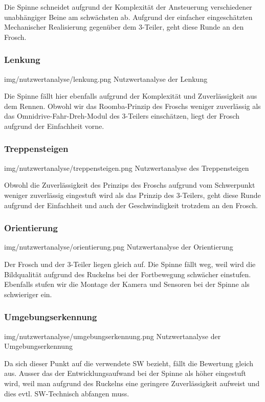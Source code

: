 Die Spinne schneidet aufgrund der Komplexität der Ansteuerung verschiedener unabhängiger Beine am schwächsten ab. Aufgrund der einfacher eingeschätzten Mechanischer Realisierung gegenüber dem 3-Teiler, geht diese Runde an den Frosch.
   
\subsubsection{Lenkung}
\image
   {img/nutzwertanalyse/lenkung.png}
   {Nutzwertanalyse der Lenkung}
   
Die Spinne fällt hier ebenfalls aufgrund der Komplexität und Zuverlässigkeit aus dem Rennen. Obwohl wir das Roomba-Prinzip des Froschs weniger zuverlässig als das Omnidrive-Fahr-Dreh-Modul des 3-Teilers einschätzen, liegt der Frosch aufgrund der Einfachheit vorne.
   
\subsubsection{Treppensteigen}
\image
   {img/nutzwertanalyse/treppensteigen.png}
   {Nutzwertanalyse des Treppensteigen}
   
Obwohl die Zuverlässigkeit des Prinzips des Froschs aufgrund vom Schwerpunkt weniger zuverlässig eingestuft wird als das Prinzip des 3-Teilers, geht diese Runde aufgrund der Einfachheit und auch der Geschwindigkeit trotzdem an den Frosch.
   
\subsubsection{Orientierung}
\image
   {img/nutzwertanalyse/orientierung.png}
   {Nutzwertanalyse der Orientierung}
   
Der Frosch und der 3-Teiler liegen gleich auf. Die Spinne fällt weg, weil wird die Bildqualität aufgrund des Ruckelns bei der Fortbewegung schwächer einstufen. Ebenfalls stufen wir die Montage der Kamera und Sensoren bei der Spinne als schwieriger ein.

\subsubsection{Umgebungserkennung}
\image
   {img/nutzwertanalyse/umgebungserkennung.png}
   {Nutzwertanalyse der Umgebungserkennung}
   
Da sich dieser Punkt auf die verwendete SW bezieht, fällt die Bewertung gleich aus. Ausser das der Entwicklungsaufwand bei der Spinne als höher eingestuft wird, weil man aufgrund des Ruckelns eine geringere Zuverlässigkeit aufweist und dies evtl. SW-Technisch abfangen muss. 
   
